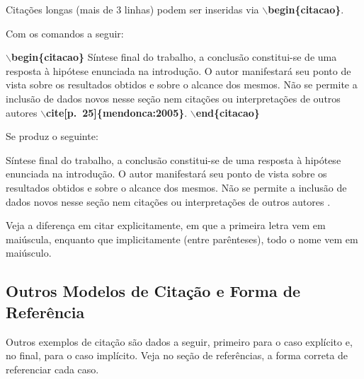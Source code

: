 \documentclass[
	article,			%
	11pt,				%
	oneside,			%
	a4paper,			%
	chapter=TITLE,
	english,			%
	brazil,				%
	sumario=tradicional
	]{templateimtec}
\newcommand{\comando}[1]{\textbf{$\backslash$#1}}
\begin{document}
  	Citações longas (mais de 3 linhas) podem ser inseridas via \comando{begin\{citacao\}}.


  	\begin{exemplo}
  	Com os comandos a seguir:

  	\comando{begin\{citacao\}}
  	Síntese final do trabalho, a conclusão constitui-se de uma resposta à hipótese enunciada na introdução. O autor manifestará seu ponto de vista sobre os resultados obtidos e sobre o alcance dos mesmos. Não se permite a inclusão de dados novos nesse seção nem citações ou interpretações de outros autores \comando{cite[p.~25]\{mendonca:2005\}}.
  	\comando{end\{citacao\}}

  	Se produz o seguinte:

  	\begin{citacao}
  	Síntese final do trabalho, a conclusão constitui-se de uma resposta à hipótese enunciada na introdução. O autor manifestará seu ponto de vista sobre os resultados obtidos e sobre o alcance dos mesmos. Não se permite a inclusão de dados novos nesse seção nem citações ou interpretações de outros autores \cite[p.~25]{mendonca:2005}.
  	\end{citacao}

  	\end{exemplo}


  	Veja a diferença em citar explicitamente, em que a primeira letra vem em maiúscula, enquanto que implicitamente (entre parênteses), todo o nome vem em maiúsculo. 


  	\subsection{Outros Modelos de Citação e Forma de Referência}

  	Outros exemplos de citação são dados a seguir, primeiro para o caso explícito e, no final, para o caso implícito. Veja no seção de referências, a forma correta de referenciar cada caso.
\end{document}

